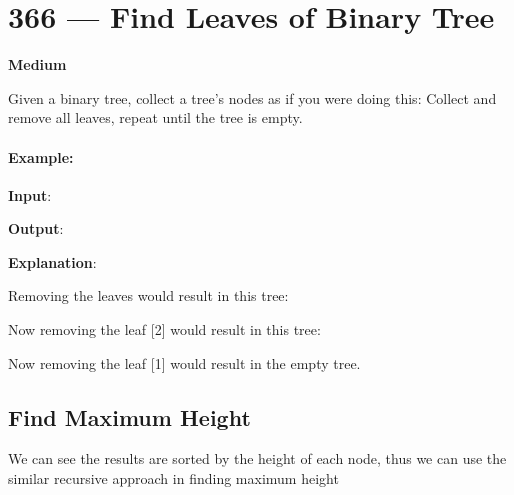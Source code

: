 \section{366 --- Find Leaves of Binary Tree}

\textbf{Medium}

Given a binary tree, collect a tree's nodes as if you were doing this: Collect and remove all leaves, repeat until the tree is empty.


\paragraph{Example:}

\begin{flushleft}
\textbf{Input}: \fcj{[1,2,3,4,5]}

\begin{figure}[H]
\end{figure}
  

\textbf{Output}: \fcj{[[4,5,3],[2],[1]]}
 

\textbf{Explanation}:

Removing the leaves \fcj{[4,5,3]} would result in this tree:

\begin{figure}[H]
\end{figure}

Now removing the leaf [2] would result in this tree:

\begin{figure}[H]
\end{figure}


Now removing the leaf [1] would result in the empty tree.
\end{flushleft}

\subsection{Find Maximum Height}
We can see the results are sorted by the height of each node, thus we can use the similar recursive approach in finding maximum height


